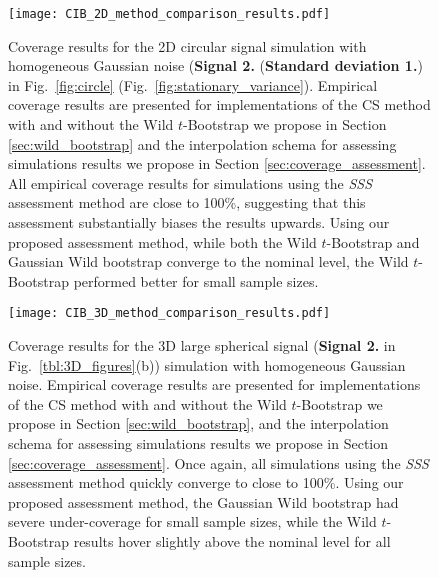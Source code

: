 \begin{figure}[htbp]
\hspace*{-1.5cm}
    \texttt{[image: CIB\_2D\_method\_comparison\_results.pdf]}
\caption{Coverage results for the 2D circular signal simulation with homogeneous Gaussian noise (\textbf{Signal 2.} (\textbf{Standard deviation 1.}) in Fig.\ \ref{fig:circle} (Fig.\ \ref{fig:stationary_variance}). Empirical coverage results are presented for implementations of the CS method with and without the Wild $t$-Bootstrap we propose in Section \ref{sec:wild_bootstrap} and the interpolation schema for assessing simulations results we propose in Section \ref{sec:coverage_assessment}. All empirical coverage results for simulations using the \textit{SSS} assessment method are close to 100\%, suggesting that this assessment substantially biases the results upwards. Using our proposed assessment method, while both the Wild $t$-Bootstrap and Gaussian Wild bootstrap converge to the nominal level, the Wild $t$-Bootstrap performed better for small sample sizes.}
\label{fig:2D_method_comparisons}
\end{figure}

\begin{figure}[htbp]
\hspace*{-1.5cm}
    \texttt{[image: CIB\_3D\_method\_comparison\_results.pdf]}
\caption{Coverage results for the 3D large spherical signal (\textbf{Signal 2.} in Fig.\ \ref{tbl:3D_figures}(b)) simulation with homogeneous Gaussian noise. Empirical coverage results are presented for implementations of the CS method with and without the Wild $t$-Bootstrap we propose in Section \ref{sec:wild_bootstrap}, and the interpolation schema for assessing simulations results we propose in Section \ref{sec:coverage_assessment}. Once again, all simulations using the \textit{SSS} assessment method quickly converge to close to 100\%. Using our proposed assessment method, the Gaussian Wild bootstrap had severe under-coverage for small sample sizes, while the Wild $t$-Bootstrap results hover slightly above the nominal level for all sample sizes.}
\label{fig:3D_method_comparisons}
\end{figure}

